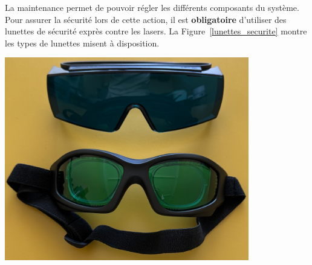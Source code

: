 \begin{minipage}[c]{0.48\textwidth}
    La maintenance permet de pouvoir régler les différents composants du système. Pour assurer la sécurité lors de cette action, il est \textbf{obligatoire} d'utiliser des lunettes de sécurité exprès contre les lasers. La Figure~\ref{lunettes_securite} montre les types de lunettes misent à disposition.
\end{minipage}\hfill
\begin{minipage}[c]{0.48\textwidth}
    \begin{center}
        \includegraphics[width=0.8\textwidth]{assets/figures/Protections_laser/Securite_electrique/lunettes_securite.jpeg}
    \end{center}
    \label{lunettes_securite}
\end{minipage}